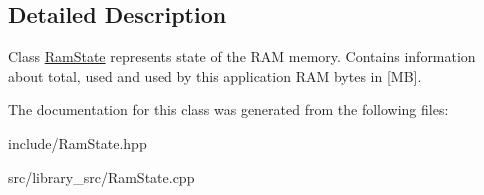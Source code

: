 \subsection{Detailed Description}
Class \hyperlink{classRamState}{Ram\+State} represents state of the R\+AM memory. Contains information about total, used and used by this application R\+AM bytes in \mbox{[}MB\mbox{]}. 

The documentation for this class was generated from the following files\+:\begin{DoxyCompactItemize}
\item 
include/Ram\+State.\+hpp\item 
src/library\+\_\+src/Ram\+State.\+cpp\end{DoxyCompactItemize}
